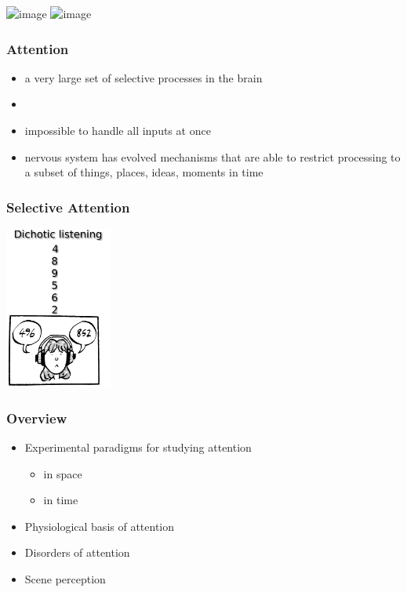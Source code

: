 \documentclass[]{beamer}
\begin{document}
\begin{frame}
 \begin{center}
\includegraphics<1>[width=50mm]{figs/l8/serial_reading.png}
\includegraphics<2->[width=100mm]{figs/l8/waldo.png}
 \end{center} 
\end{frame}


\begin{frame}
 \frametitle{Attention}
\begin{overlayarea}{110mm}{80mm}
 \begin{itemize}
  \item a very large set of selective processes in the brain
 \item[] 
 \item<2-> impossible to handle all inputs at once
 \item<2-> nervous system has evolved mechanisms that are able to restrict processing to a subset of things, places, ideas, moments in time
 \end{itemize}
 \begin{center}
 \end{center} 
\end{overlayarea}
 \end{frame}

\begin{frame}
\frametitle{Selective Attention}
 \begin{center}
\includegraphics[width=35mm]{figs/l1/dichotic_listening_task.png}
 \end{center} 
\end{frame}


\begin{frame}
 \frametitle{Overview}
\begin{itemize}[<+->]
  \setlength{\itemsep}{5pt}
 \item Experimental paradigms for studying attention
 \begin{itemize}
  \item in space
  \item in time
 \end{itemize}
 \item Physiological basis of attention
 \item Disorders of attention
 \item Scene perception
\end{itemize}
\end{frame}
\end{document}
